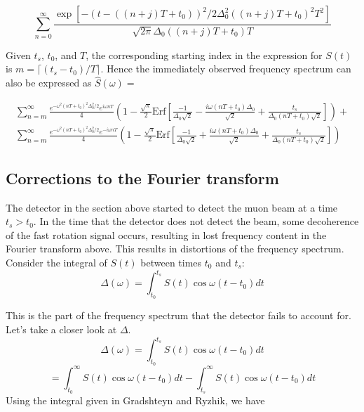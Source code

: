 \begin{equation}
\sum^{\infty}_{n=0}\frac{\exp[-(t-((n+j)T+t_0))^2/2\Delta^2_0((n+j)T+t_0)^2T^2]}{\sqrt{2\pi}\Delta_0((n+j)T+t_0)T}
\end{equation}

Given $t_s$, $t_0$, and $T$, the corresponding starting index in the expression for $S(t)$ is $m=\lceil{(t_s-t_0)/T}\rceil$. Hence the immediately observed frequency spectrum can also be expressed as $\hat{S}(\omega)=$ 

\begin{gather}
\sum^{\infty}_{n=m}\frac{e^{-\omega^2(nT+t_0)^2\Delta^2_0/2}e^{i\omega nT}}{4}\left(1-\frac{\sqrt{\pi}}{2}\text{Erf}\left[\frac{-1}{\Delta_0\sqrt{2}}-\frac{i\omega (nT+t_0)\Delta_0}{\sqrt{2}}+\frac{t_s}{\Delta_0(nT+t_0)\sqrt{2}}\right]\right)+ \nonumber \\
\sum^{\infty}_{n=m}\frac{e^{-\omega^2(nT+t_0)^2\Delta^2_0/2}e^{-i\omega nT}}{4}\left(1-\frac{\sqrt{\pi}}{2}\text{Erf}\left[\frac{-1}{\Delta_0\sqrt{2}}+\frac{i\omega (nT+t_0)\Delta_0}{\sqrt{2}}+\frac{t_s}{\Delta_0(nT+t_0)\sqrt{2}}\right]\right)
\end{gather}

\subsection{Corrections to the Fourier transform} The detector in the section above started to detect the muon beam at a time $t_s>t_0$. In the time that the detector does not detect the beam, some decoherence of the fast rotation signal occurs, resulting in lost frequency content in the Fourier transform above. This results in distortions of the frequency spectrum.  Consider the integral of $S(t)$ between times $t_0$ and $t_s$: 
\begin{equation}
\Delta(\omega)=\int^{t_s}_{t_0}S(t)\cos\omega(t-t_0)dt
\end{equation}

This is the part of the frequency spectrum that the detector fails to account for. Let's take a closer look at $\Delta$. \[\Delta(\omega)=\int^{t_s}_{t_0}S(t)\cos\omega(t-t_0)dt\]\[=\int^{\infty}_{t_0}S(t)\cos\omega(t-t_0)dt-\int^{\infty}_{t_s}S(t)\cos\omega(t-t_0)dt\] Using the integral given in Gradshteyn and Ryzhik, we have 


